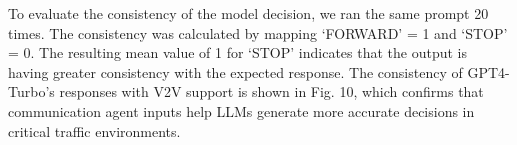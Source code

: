 \documentclass[conference]{IEEEtran}
\begin{document}
To evaluate the consistency of the model decision, we ran the same prompt 20 times. The consistency was calculated by mapping `FORWARD' = 1 and `STOP' = 0. The resulting mean value of 1 for `STOP' indicates that the output is having greater consistency with the expected response. The consistency of GPT4-Turbo's responses with V2V support is shown in Fig. 10, which confirms that communication agent inputs help LLMs generate more accurate decisions in critical traffic environments.





\end{document}

